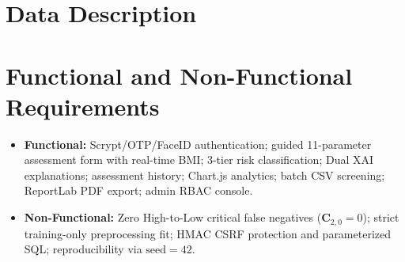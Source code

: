 \documentclass[12pt,a4paper]{report}
\begin{document}
\section{Data Description}
\begin{table}[htbp]
\centering
\caption{Datasets and persistence stores used by NutriRisk AI}
\label{tab:data_desc}
\end{table}

\section{Functional and Non-Functional Requirements}
\begin{itemize}
    \item \textbf{Functional:} Scrypt/OTP/FaceID authentication; guided 11-parameter assessment form with real-time BMI; 3-tier risk classification; Dual XAI explanations; assessment history; Chart.js analytics; batch CSV screening; ReportLab PDF export; admin RBAC console.
    \item \textbf{Non-Functional:} Zero High-to-Low critical false negatives ($\mathbf{C}_{2,0}=0$); strict training-only preprocessing fit; HMAC CSRF protection and parameterized SQL; reproducibility via $\text{seed}=42$.
\end{itemize}

\end{document}
